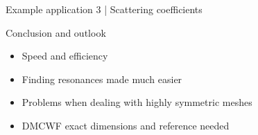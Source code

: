 \documentclass{beamer}
\begin{document}
\begin{frame}{Example application 3 | Scattering coefficients}

    \begin{figure}
        \centering
        \scalebox{0.8}{}
    \end{figure}

\end{frame}

\begin{frame}{Conclusion and outlook}

    \begin{itemize}
        \item<1-> Speed and efficiency
        \item<2-> Finding resonances made much easier
        \item<3-> Problems when dealing with highly symmetric meshes
        \item<4-> DMCWF exact dimensions and reference needed
    \end{itemize}

\end{frame}
\end{document}
